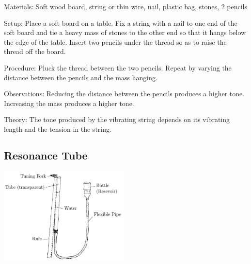 \begin{multicols}{2}
\begin{description*}
\item[Materials:]{Soft wood board, string or thin wire, nail, plastic bag, stones, 2 pencils}
\item[Setup:]{Place a soft board on a table. Fix a string with a nail to one end of the soft board and tie a heavy mass of stones to the other end so that it hangs below the edge of the table. Insert two pencils under the thread so as to raise the thread off the board.}
\item[Procedure:]{Pluck the thread between the two pencils. Repeat by varying the distance between the pencils and the mass hanging.}
\item[Observations:]{Reducing the distance between the pencils produces a higher tone. Increasing the mass produces a higher tone.}
\item[Theory:]{The tone produced by the vibrating string depends on its vibrating length and the tension in the string.}
\end{description*}

\vfill
\columnbreak

\subsection{Resonance Tube}

\begin{center}
\includegraphics[width=0.49\textwidth]{./img/resonance-tube.png}
\end{center}


\end{multicols}
